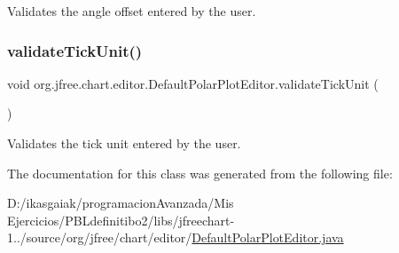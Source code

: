 Validates the angle offset entered by the user. \mbox{\label{classorg_1_1jfree_1_1chart_1_1editor_1_1_default_polar_plot_editor_a6abb94aa4eb93557fc23bb6a21c66854}} 
\subsubsection{\texorpdfstring{validate\+Tick\+Unit()}{validateTickUnit()}}
{\footnotesize\ttfamily void org.\+jfree.\+chart.\+editor.\+Default\+Polar\+Plot\+Editor.\+validate\+Tick\+Unit (\begin{DoxyParamCaption}{ }\end{DoxyParamCaption})}

Validates the tick unit entered by the user. 

The documentation for this class was generated from the following file\+:\begin{DoxyCompactItemize}
\item 
D\+:/ikasgaiak/programacion\+Avanzada/\+Mis Ejercicios/\+P\+B\+Ldefinitibo2/libs/jfreechart-\/1../source/org/jfree/chart/editor/\mbox{\hyperlink{_default_polar_plot_editor_8java}{Default\+Polar\+Plot\+Editor.\+java}}\end{DoxyCompactItemize}
